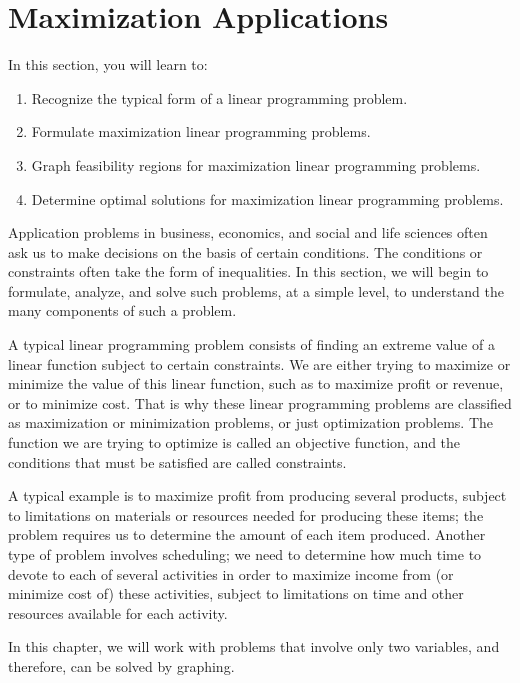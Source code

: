 \section{Maximization Applications}\label{section_maximization_geometry}

In this section, you will learn to:
\begin{enumerate}
    \item Recognize the typical form of a linear programming problem.
    \item Formulate maximization linear programming problems.
    \item Graph feasibility regions for maximization linear programming problems.
    \item Determine optimal solutions for maximization linear programming problems.
\end{enumerate}

Application problems in business, economics, and social and life sciences often ask us to make decisions on the basis of certain conditions.  The conditions or constraints  often take the form of inequalities.  In this section, we will begin to formulate, analyze, and solve such problems, at a simple level, to understand the many components of such a problem.

A typical linear programming problem consists of finding an extreme value of a linear function subject to certain constraints.  We are either trying to maximize or minimize the value of this linear function, such as to maximize profit or revenue, or to minimize cost.  That is why these linear programming problems are classified as maximization or minimization problems, or just optimization problems.  The function we are trying to optimize is called an objective function, and the conditions that must be satisfied are called constraints.

A typical example is to maximize profit from producing several products, subject to limitations on materials or resources needed for producing these items; the problem requires us to determine the amount of each item produced.  Another type of problem involves scheduling; we need to determine how much time to devote to each of several activities in order to maximize income from (or minimize cost of) these activities, subject to limitations on time and other resources available for each activity.

In this chapter, we will work with problems that involve only two variables, and therefore, can be solved by graphing.


